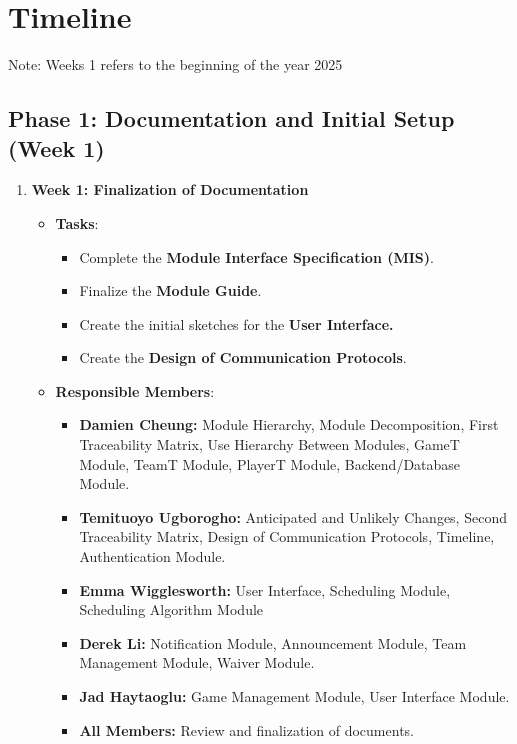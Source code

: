 \documentclass[12pt, titlepage]{article}
\begin{document}
\section{Timeline}

Note: Weeks 1 refers to the beginning of the year 2025

\subsection*{Phase 1: Documentation and Initial Setup (Week 1)}

\begin{enumerate}
  \item \textbf{Week 1: Finalization of Documentation}
        \begin{itemize}
          \item \textbf{Tasks}:
                \begin{itemize}
                  \item Complete the \textbf{Module Interface Specification (MIS)}.
                  \item Finalize the \textbf{Module Guide}.
                  \item Create the initial sketches for the \textbf{User Interface.}
                  \item Create the \textbf{Design of Communication Protocols}.
                \end{itemize}
          \item \textbf{Responsible Members}:
                \begin{itemize}
                  \item \textbf{Damien Cheung:} Module Hierarchy, Module Decomposition, First Traceability Matrix, Use Hierarchy Between Modules,
                        GameT Module, TeamT Module, PlayerT Module, Backend/Database Module.
                  \item \textbf{Temituoyo Ugborogho:} Anticipated and Unlikely Changes, Second Traceability Matrix, Design of Communication Protocols,
                        Timeline, Authentication Module.
                  \item \textbf{Emma Wigglesworth:} User Interface, Scheduling Module, Scheduling Algorithm Module
                  \item \textbf{Derek Li:} Notification Module, Announcement Module, Team Management Module, Waiver Module.
                  \item \textbf{Jad Haytaoglu:} Game Management Module, User Interface Module.
                  \item \textbf{All Members:} Review and finalization of documents.
                \end{itemize}
        \end{itemize}
\end{enumerate}
\end{document}
